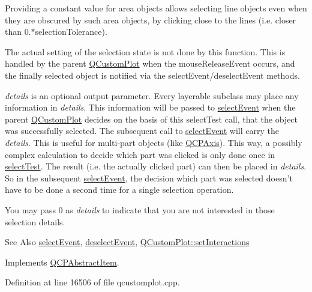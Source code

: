 Providing a constant value for area objects allows selecting line objects even when they are obscured by such area objects, by clicking close to the lines (i.\-e. closer than 0.$\ast$selection\-Tolerance).

The actual setting of the selection state is not done by this function. This is handled by the parent \hyperlink{class_q_custom_plot}{Q\-Custom\-Plot} when the mouse\-Release\-Event occurs, and the finally selected object is notified via the select\-Event/deselect\-Event methods.

{\itshape details} is an optional output parameter. Every layerable subclass may place any information in {\itshape details}. This information will be passed to \hyperlink{class_q_c_p_abstract_item_aaf92af7b9893712959a6c073d334d88d}{select\-Event} when the parent \hyperlink{class_q_custom_plot}{Q\-Custom\-Plot} decides on the basis of this select\-Test call, that the object was successfully selected. The subsequent call to \hyperlink{class_q_c_p_abstract_item_aaf92af7b9893712959a6c073d334d88d}{select\-Event} will carry the {\itshape details}. This is useful for multi-\/part objects (like \hyperlink{class_q_c_p_axis}{Q\-C\-P\-Axis}). This way, a possibly complex calculation to decide which part was clicked is only done once in \hyperlink{class_q_c_p_item_bracket_aa6933caff1d42c54bcebc769ef88c798}{select\-Test}. The result (i.\-e. the actually clicked part) can then be placed in {\itshape details}. So in the subsequent \hyperlink{class_q_c_p_abstract_item_aaf92af7b9893712959a6c073d334d88d}{select\-Event}, the decision which part was selected doesn't have to be done a second time for a single selection operation.

You may pass 0 as {\itshape details} to indicate that you are not interested in those selection details.

\begin{DoxySeeAlso}{See Also}
\hyperlink{class_q_c_p_abstract_item_aaf92af7b9893712959a6c073d334d88d}{select\-Event}, \hyperlink{class_q_c_p_abstract_item_a91f090d6763cfedb0749219c63788ae9}{deselect\-Event}, \hyperlink{class_q_custom_plot_a5ee1e2f6ae27419deca53e75907c27e5}{Q\-Custom\-Plot\-::set\-Interactions} 
\end{DoxySeeAlso}


Implements \hyperlink{class_q_c_p_abstract_item_a96d522d10ffc0413b9a366c6f7f0476b}{Q\-C\-P\-Abstract\-Item}.



Definition at line 16506 of file qcustomplot.\-cpp.

